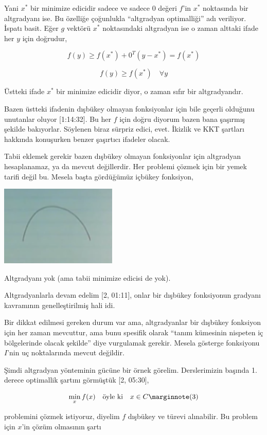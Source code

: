 \documentclass[12pt,fleqn]{article}\usepackage{../../common}
\begin{document}
Yani $x^\ast$ bir minimize edicidir sadece ve sadece 0 değeri $f$'in $x^\ast$
noktasında bir altgradyanı ise. Bu özelliğe çoğunlukla ``altgradyan
optimalliği'' adı veriliyor. İspatı basit. Eğer $g$ vektörü $x^\ast$
noktasındaki altgradyan ise o zaman alttaki ifade her $y$ için doğrudur,

$$
f(y) \ge f(x^\ast) + 0^T (y-x^\ast) = f(x^\ast)
$$

$$
f(y) \ge f(x^\ast) \quad \forall y
$$

Üstteki ifade $x^\ast$ bir minimize edicidir diyor, o zaman sıfır bir
altgradyandır. 

Bazen üstteki ifadenin dışbükey olmayan fonksiyonlar için bile geçerli
olduğunu unutanlar oluyor [1:14:32]. Bu her $f$ için doğru diyorum bazen
bana şaşırmış şekilde bakıyorlar. Söylenen biraz sürpriz edici,
evet. İkizlik ve KKT şartları hakkında konuşurken benzer şaşırtıcı ifadeler
olacak.

Tabii eklemek gerekir bazen dışbükey olmayan fonksiyonlar için altgradyan
hesaplanamaz, ya da mevcut değillerdir. Her problemi çözmek için bir yemek
tarifi değil bu. Mesela başta gördüğümüz içbükey fonksiyon,

\includegraphics[width=15em]{func_42_subgrad_01.png}

Altgradyanı yok (ama tabii minimize edicisi de yok). 

Altgradyanlarla devam edelim [2, 01:11], onlar bir dışbükey fonksiyonun
gradyanı kavramının genelleştirilmiş hali idi. 

Bir dikkat edilmesi gereken durum var ama, altgradyanlar bir dışbükey
fonksiyon için her zaman mevcuttur, ama bunu spesifik olarak ``tanım
kümesinin nispeten iç bölgelerinde olacak şekilde'' diye vurgulamak
gerekir. Mesela gösterge fonksiyonu $I$'nin uç noktalarında mevcut değildir.

Şimdi altgradyan yönteminin gücüne bir örnek görelim. Derslerimizin başında
1. derece optimallik şartını görmüştük [2, 05:30],

$$
\min_x f(x) \quad \textrm{öyle ki} \quad x \in C
\mlabel{3}
$$

problemini çözmek istiyoruz, diyelim $f$ dışbükey ve türevi alınabilir. Bu
problem için $x$'in çözüm olmasının şartı 
\end{document}
